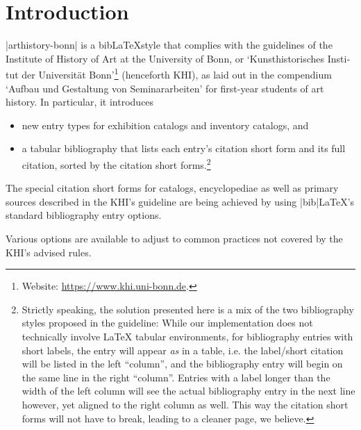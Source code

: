 \documentclass[a4paper,
10pt,
ngerman,
english
]{ltxdoc}
\begin{document}
\section{Introduction}
|arthistory-bonn| is a bib\LaTeX style that complies with the guidelines of the Institute of History of Art at the University of Bonn, or \foreignquote*{ngerman}{Kunsthistorisches Institut der Universität Bonn}\footnote{Website: \url{https://www.khi.uni-bonn.de}.} (henceforth KHI), as laid out in the compendium \foreignquote*{ngerman}{Aufbau und Gestaltung von Seminararbeiten} for first-year students of art history. In particular, it introduces
\begin{itemize}
	\item new entry types for exhibition catalogs and inventory catalogs, and
	\item a tabular bibliography that lists each entry's citation short form and its full citation, sorted by the citation short forms.\footnote{Strictly speaking, the solution presented here is a mix of the two bibliography styles proposed in the guideline: While our implementation does not technically involve \LaTeX{} tabular environments, for bibliography entries with short labels, the entry will appear \emph{as} in a table, i.e. the label/short citation will be listed in the left \enquote{column}, and the bibliography entry will begin on the same line in the right \enquote{column}. Entries with a label longer than the width of the left column will see the actual bibliography entry in the next line however, yet aligned to the right column as well. This way the citation short forms will not have to break, leading to a cleaner page, we believe.}
\end{itemize}
The special citation short forms for catalogs, encyclopediae as well as primary sources described in the KHI's guideline are being achieved by using |bib|\LaTeX's standard bibliography entry options.

Various options are available to adjust to common practices not covered by the KHI's advised rules.
\end{document}
